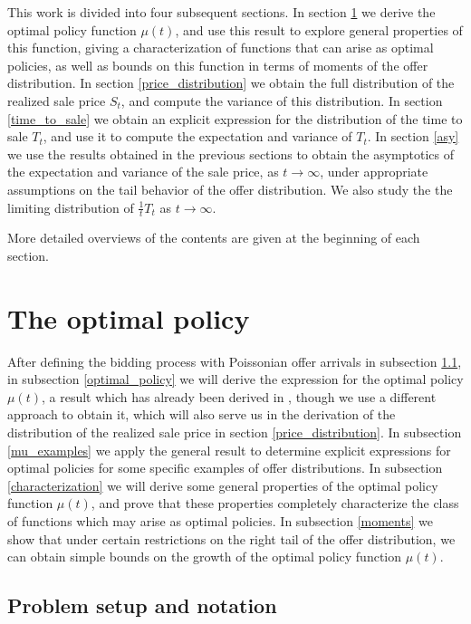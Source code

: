 \documentclass{article}
\numberwithin{equation}{section}
\begin{document}
This work is divided into four subsequent sections. In section \ref{optimal_policy0} we derive 
the optimal policy function $\mu(t)$, and use this result to explore general properties of this function, giving a
characterization of functions that can arise as optimal policies, as well as bounds on this function in terms of moments of the offer distribution.
In section \ref{price_distribution}
we obtain the full distribution of the realized sale price $S_t$, and compute the variance of this distribution. In
section \ref{time_to_sale} we  obtain an explicit expression for
the distribution of the time to sale 
$T_t$, and use it to compute the expectation and variance of $T_t$.
In section \ref{asy} we 
use the results obtained in the
previous sections to obtain the asymptotics of the expectation and variance of the sale price, as $t\rightarrow \infty$, under 
appropriate assumptions on the tail
behavior of the offer distribution. We also study the the limiting distribution of $\frac{1}{t}T_t$ as 
$t\rightarrow \infty$. 

More detailed overviews of the contents are given at the beginning of each section.

\section{The optimal policy}
\label{optimal_policy0}

After defining the bidding process
with Poissonian offer arrivals in subsection \ref{setup}, in subsection \ref{optimal_policy} we will derive the 
expression for the optimal policy $\mu(t)$, a result which has already 
been derived in \cite{Karlin}, though we 
use a different approach to obtain it, which will also serve us in the derivation of the distribution of the realized sale price in section \ref{price_distribution}. In subsection \ref{mu_examples} we apply the general  result to determine explicit expressions for optimal policies for some specific examples of 
offer distributions.
In subsection \ref{characterization}
we will derive some general properties 
of the optimal policy function $\mu(t)$,
and prove that these properties completely characterize the class of functions which may arise as optimal policies. In subsection \ref{moments} we show that under certain restrictions on the right tail of the offer distribution, we can obtain simple bounds on the growth of the optimal policy function $\mu(t)$.


\subsection{Problem setup and notation}
\label{setup}
\end{document}
